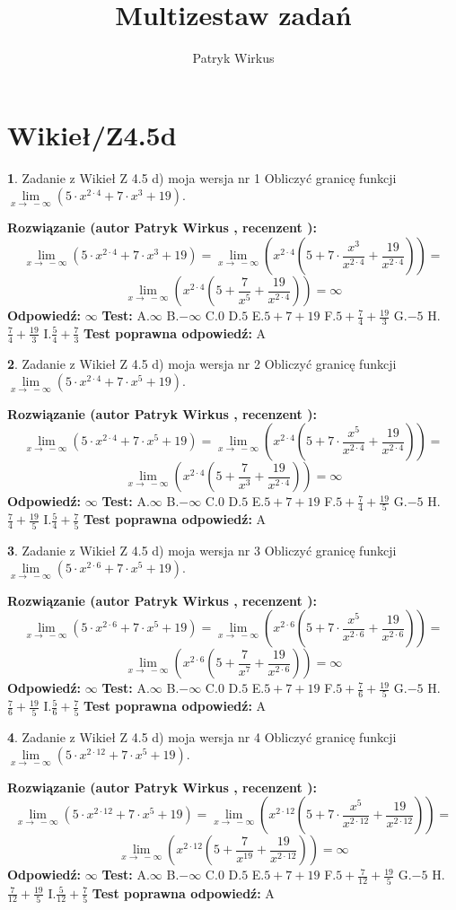 \documentclass[12pt, a4paper]{article}
\title{Multizestaw zadań}
\author{Patryk Wirkus}
\date{}
\theoremstyle{definition} %
\newtheorem{zad}{}
\newcommand{\kategoria}[1]{\section{#1}}
\newcommand{\zadStart}[1]{\begin{zad}#1\newline}
\newcommand{\zadStop}{\end{zad}}
\newcommand{\rozwStart}[2]{\noindent \textbf{Rozwiązanie (autor #1 , recenzent #2): }\newline}
\newcommand{\rozwStop}{\newline}
\newcommand{\odpStart}{\noindent \textbf{Odpowiedź:}\newline}
\newcommand{\odpStop}{\newline}
\newcommand{\testStart}{\noindent \textbf{Test:}\newline}
\newcommand{\testStop}{\newline}
\newcommand{\kluczStart}{\noindent \textbf{Test poprawna odpowiedź:}\newline}
\newcommand{\kluczStop}{\newline}
\begin{document}
\maketitle

\kategoria{Wikieł/Z4.5d}


\zadStart{Zadanie z Wikieł Z 4.5 d) moja wersja nr 1}
Obliczyć granicę funkcji  $\lim\limits_{x\to\ -\infty}(5 \cdot x^{2\cdot4}+7 \cdot x^{3}+19)$.
\zadStop
\rozwStart{Patryk Wirkus}{}
$$\lim\limits_{x\to\ -\infty}(5 \cdot x^{2\cdot4}+7 \cdot x^{3}+19) = \lim\limits_{x\to\ -\infty}(x^{2\cdot4}(5 +7 \cdot \frac{x^{3}}{x^{2\cdot4}}+\frac{19}{x^{2\cdot4}})) =$$ $$\lim\limits_{x\to\ -\infty}(x^{2\cdot4}(5 +\frac{7}{x^{5}}+\frac{19}{x^{2\cdot4}})) =\infty$$
\rozwStop
\odpStart
$\infty$
\odpStop
\testStart
A.$\infty$ B.$-\infty$ C.$0$ D.$5$ E.$5 + 7 + 19$
F.$5+\frac{7}{4}+\frac{19}{3}$ G.$-5$
H.$\frac{7}{4}+\frac{19}{3}$
I.$\frac{5}{4}+\frac{7}{3}$
\testStop
\kluczStart
A
\kluczStop



\zadStart{Zadanie z Wikieł Z 4.5 d) moja wersja nr 2}
Obliczyć granicę funkcji  $\lim\limits_{x\to\ -\infty}(5 \cdot x^{2\cdot4}+7 \cdot x^{5}+19)$.
\zadStop
\rozwStart{Patryk Wirkus}{}
$$\lim\limits_{x\to\ -\infty}(5 \cdot x^{2\cdot4}+7 \cdot x^{5}+19) = \lim\limits_{x\to\ -\infty}(x^{2\cdot4}(5 +7 \cdot \frac{x^{5}}{x^{2\cdot4}}+\frac{19}{x^{2\cdot4}})) =$$ $$\lim\limits_{x\to\ -\infty}(x^{2\cdot4}(5 +\frac{7}{x^{3}}+\frac{19}{x^{2\cdot4}})) =\infty$$
\rozwStop
\odpStart
$\infty$
\odpStop
\testStart
A.$\infty$ B.$-\infty$ C.$0$ D.$5$ E.$5 + 7 + 19$
F.$5+\frac{7}{4}+\frac{19}{5}$ G.$-5$
H.$\frac{7}{4}+\frac{19}{5}$
I.$\frac{5}{4}+\frac{7}{5}$
\testStop
\kluczStart
A
\kluczStop



\zadStart{Zadanie z Wikieł Z 4.5 d) moja wersja nr 3}
Obliczyć granicę funkcji  $\lim\limits_{x\to\ -\infty}(5 \cdot x^{2\cdot6}+7 \cdot x^{5}+19)$.
\zadStop
\rozwStart{Patryk Wirkus}{}
$$\lim\limits_{x\to\ -\infty}(5 \cdot x^{2\cdot6}+7 \cdot x^{5}+19) = \lim\limits_{x\to\ -\infty}(x^{2\cdot6}(5 +7 \cdot \frac{x^{5}}{x^{2\cdot6}}+\frac{19}{x^{2\cdot6}})) =$$ $$\lim\limits_{x\to\ -\infty}(x^{2\cdot6}(5 +\frac{7}{x^{7}}+\frac{19}{x^{2\cdot6}})) =\infty$$
\rozwStop
\odpStart
$\infty$
\odpStop
\testStart
A.$\infty$ B.$-\infty$ C.$0$ D.$5$ E.$5 + 7 + 19$
F.$5+\frac{7}{6}+\frac{19}{5}$ G.$-5$
H.$\frac{7}{6}+\frac{19}{5}$
I.$\frac{5}{6}+\frac{7}{5}$
\testStop
\kluczStart
A
\kluczStop



\zadStart{Zadanie z Wikieł Z 4.5 d) moja wersja nr 4}
Obliczyć granicę funkcji  $\lim\limits_{x\to\ -\infty}(5 \cdot x^{2\cdot12}+7 \cdot x^{5}+19)$.
\zadStop
\rozwStart{Patryk Wirkus}{}
$$\lim\limits_{x\to\ -\infty}(5 \cdot x^{2\cdot12}+7 \cdot x^{5}+19) = \lim\limits_{x\to\ -\infty}(x^{2\cdot12}(5 +7 \cdot \frac{x^{5}}{x^{2\cdot12}}+\frac{19}{x^{2\cdot12}})) =$$ $$\lim\limits_{x\to\ -\infty}(x^{2\cdot12}(5 +\frac{7}{x^{19}}+\frac{19}{x^{2\cdot12}})) =\infty$$
\rozwStop
\odpStart
$\infty$
\odpStop
\testStart
A.$\infty$ B.$-\infty$ C.$0$ D.$5$ E.$5 + 7 + 19$
F.$5+\frac{7}{12}+\frac{19}{5}$ G.$-5$
H.$\frac{7}{12}+\frac{19}{5}$
I.$\frac{5}{12}+\frac{7}{5}$
\testStop
\kluczStart
A
\kluczStop
\end{document}

